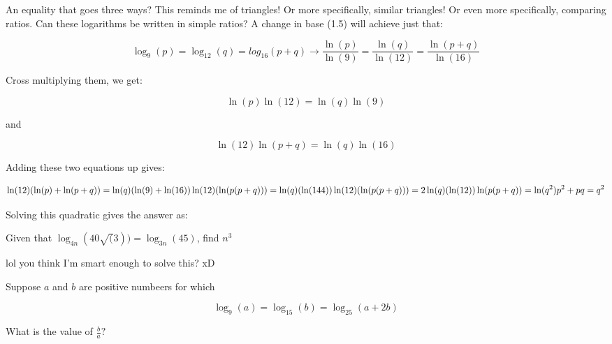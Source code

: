 \begin{solution}

An equality that goes three ways? This reminds me of triangles! Or more specifically, similar triangles! Or even more specifically, comparing ratios. Can these logarithms be written in simple ratios? A change in base (1.5) will achieve just that:

$$
   \log_9(p) = \log_{12}(q) = log_{16}(p+q) \rightarrow
   \frac{\ln(p)}{\ln(9)} = \frac{\ln(q)}{\ln(12)} = \frac{\ln(p+q)}{\ln(16)}
$$

\newpage

Cross multiplying them, we get:

$$
  \ln(p)\ln(12) = \ln(q)\ln(9)
$$

and

$$
  \ln(12)\ln(p+q) = \ln(q)\ln(16)
$$

Adding these two equations up gives:

$$
  \ln(12)(\ln(p)+\ln(p+q)) = \ln(q)(\ln(9)+\ln(16)) \\
  \ln(12)(\ln(p(p+q))) = \ln(q)(\ln(144)) \\
  \ln(12)(\ln(p(p+q))) = 2\ln(q)(\ln(12)) \\
  \ln(p(p+q)) = \ln(q^2) \\
  p^2 + pq = q^2
$$

Solving this quadratic gives the answer as: 

\end{solution}


\begin{question}

Given that $\log_{4n}(40\sqrt(3)) = \log_{3n}(45)$, find $n^3$

\end{question}
  
\begin{solution}

lol you think I'm smart enough to solve this? xD

\end{solution}


\begin{question}

Suppose $a$ and $b$ are positive numbeers for which

$$
  \log_9(a) = \log_{15}(b) = \log_{25}(a+2b)
$$

What is the value of $\frac{b}{a}?$

\end{question}
    
